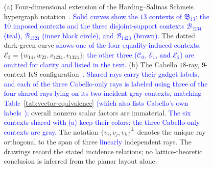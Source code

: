 \documentclass[%
  reprint,
  superscriptaddress,
  showkeys,
  amsmath,amssymb,
  aps,pra,
  longbibliography,
  floatfix,
  x11names
]{revtex4-2}
\DeclareRobustCommand{\chg}[1]{\textcolor{blue}{#1}}
\begin{document}
\begin{figure}[ht]
\begin{tabular}{ccc}

\end{tabular}
\caption{
(a) Four-dimensional extension of the Harding--Salinas Schmeis hypergraph notation~\cite{harding2025remarksIJTP}.  \chg{Solid curves show the $13$ contexts of $\mathfrak{B}_{13}$: the $10$ imposed contexts and the three disjoint-support contexts $\mathcal{B}_{1234}$ (teal), $\mathcal{B}_{1324}$ (inner black circle), and $\mathcal{B}_{1423}$ (brown).}  The dotted dark-green curve \chg{shows one of the four equality-induced contexts,} $\mathcal{E}_3=\{w_{14},w_{23},v_{1234},v_{1324}\}$; \chg{the other three ($\mathcal{C}_0$, $\mathcal{E}_1$, and $\mathcal{E}_2$) are omitted for clarity and listed in the text.}  (b) The Cabello $18$-ray, $9$-context KS configuration~\cite{cabello-96}.  \chg{Shared rays carry their gadget labels, and each of the three Cabello-only rays is labeled using three of the four shared rays lying on its two incident gray contexts, matching Table~\ref{tab:vector-equivalence} (which also lists Cabello's own labels~\cite{cabello:210401});} overall nonzero scalar factors are immaterial.  \chg{The six contexts shared with (a) keep their colors; the three Cabello-only contexts are gray.}  The notation $\{v_i,v_j,v_k\}^{\perp}$ denotes the unique ray orthogonal to the span of three \chg{linearly} independent rays.  The drawings record the stated incidence relations; no lattice-theoretic conclusion is inferred from the planar layout alone.
}
\label{fig:peres}
\end{figure}
\end{document}
